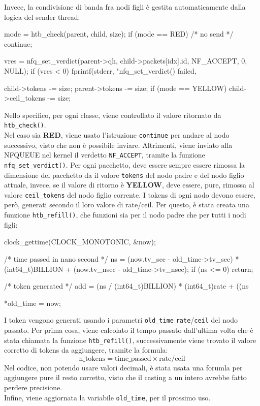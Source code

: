 Invece, la condivisione di banda fra nodi figli è gestita automaticamente dalla logica del sender thread:
\begin{clang}
mode = htb_check(parent, child, size);
if (mode == RED) {
  /* no send */
  continue;
}

vres = nfq_set_verdict(parent->qh, child->packets[idx].id, NF_ACCEPT, 0, NULL);
if (vres < 0) {
  fprintf(stderr, "nfq_set_verdict() failed, %
}

child->tokens -= size;
parent->tokens -= size;
if (mode == YELLOW) {
  child->ceil_tokens -= size;
}
\end{clang}
Nello specifico, per ogni classe, viene controllato il valore ritornato da \texttt{htb\_check()}. \\
Nel caso sia \textbf{RED}, viene usato l'istruzione \texttt{continue} per andare al nodo successivo, visto che non è possibile inviare.
Altrimenti, viene inviato alla NFQUEUE nel kernel il verdetto \texttt{NF\_ACCEPT}, tramite la funzione \texttt{nfq\_set\_verdict()}.
Per ogni pacchetto, deve essere sempre essere rimossa la dimensione del pacchetto da il valore \texttt{tokens} del nodo padre e del nodo figlio attuale,
invece, se il valore di ritorno è \textbf{YELLOW}, deve essere, pure, rimossa al valore \texttt{ceil\_tokens} del nodo figlio corrente.
\vspace*{0.01\textheight}
I tokens di ogni nodo devono essere, però, generati secondo il loro valore di rate/ceil. 
Per questo, è stata creata una funzione \texttt{htb\_refill()}, che funzioni sia per il nodo padre che per tutti i nodi figli:
\begin{clang}
clock_gettime(CLOCK_MONOTONIC, &now);

/* time passed in nano second */
ns = (now.tv_sec - old_time->tv_sec) * (int64_t)BILLION + (now.tv_nsec - old_time->tv_nsec);
if (ns <= 0) {
	return;
}

/* token generated */
add = (ns / (int64_t)BILLION) * (int64_t)rate + ((ns %

*old_time = now;
\end{clang}
I token vengono generati usando i parametri \texttt{old\_time} \texttt{rate}/\texttt{ceil} del nodo passato.
Per prima cosa, viene calcolato il tempo passato dall'ultima volta che è stata chiamata la funzione \texttt{htb\_refill()}, successivamente viene trovato il valore corretto di tokens da aggiungere, tramite la formula:
\[
  \text{n\_tokens} = \text{time\_passed} \times \text{rate/ceil}
\]
Nel codice, non potendo usare valori decimali, è stata usata una forumla per aggiungere pure il resto corretto, visto che il casting a un intero avrebbe fatto perdere precisione.\\ 
Infine, viene aggiornata la variabile \texttt{old\_time}, per il prossimo uso.

